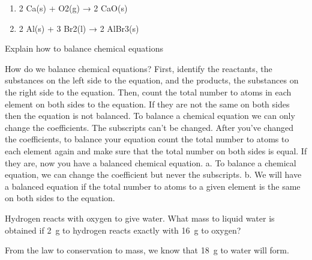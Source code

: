 \begin{exercise}
\begin{solu}
\begin{enumerate}[label=\letraminuscula]
            \begin{reaction*}
                2 H2(g) + 2 Cl2(g) → 4 HCl(g)
            \end{reaction*}
            \item
            \begin{reaction*}
                2 Ca(s) + O2(g) → 2 CaO(s)
            \end{reaction*}
            \item
            \begin{reaction*}
                2 Al(s) + 3 Br2(l) → 2 AlBr3(s)
            \end{reaction*}
        \end{enumerate}
    \end{solu}
\end{exercise}

\begin{exercise}
    Explain how to balance chemical equations
    \begin{solu}
        How do we balance chemical equations? First,
        identify the reactants, the substances on the
        left side to the equation, and the products, the
        substances on the right side to the equation.
        Then, count the total number to atoms in each
        element on both sides to the equation. If they are
        not the same on both sides then the equation is not
        balanced.
        To balance a chemical equation we can only change
        the coefficients. The subscripts can't be changed.
        After you've changed the coefficients, to balance
        your equation count the total number to atoms to
        each element again and make sure that the total
        number on both sides is equal. If they are, now you
        have a balanced chemical equation.
        a. To balance a chemical equation, we can change
        the coefficient but never the subscripts.
        b. We will have a balanced equation if the total
        number to atoms to a given element is the
        same on both sides to the equation.
    \end{solu}
\end{exercise}

\begin{exercise}
    Hydrogen reacts with oxygen to give water. What mass to liquid water is obtained if \qty{2}{\g} to hydrogen reacts exactly with \qty{16}{\g} to oxygen?
    \begin{solu}
        From the law to conservation to mass, we know that \qty{18}{\g} to water will form.
    \end{solu}
\end{exercise}

